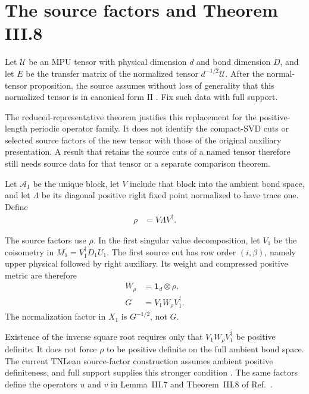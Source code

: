 \documentclass{article}
\begin{document}
\section{The source factors and Theorem III.8}

Let $\mathcal U$ be an MPU tensor with physical dimension $d$ and bond
dimension $D$, and let $E$ be the transfer matrix of the normalized tensor
$d^{-1/2}\mathcal U$. After the normal-tensor proposition, the source assumes
without loss of generality that this normalized tensor is in canonical form II
\cite[discussion following Proposition~III.1]{Cirac2017MPU}. Fix such data with
full support.

The reduced-representative theorem justifies this replacement for the
positive-length periodic operator family. It does not identify the compact-SVD
cuts or selected source factors of the new tensor with those of the original
auxiliary presentation. A result that retains the source cuts of a named tensor
therefore still needs source data for that tensor or a separate comparison
theorem.

Let $\mathcal A_1$ be the unique block, let $V$ include that block into the
ambient bond space, and let $\Lambda$ be its diagonal positive right fixed
point normalized to have trace one. Define
\begin{align}
    \rho & = V\Lambda V^\dagger.
    \label{eq:mpu_canonical_form_full_support_ambient_fixed_point}
\end{align}

The source factors use $\rho$. In the first singular value decomposition, let
$V_1$ be the coisometry in $M_1=V_1^\dagger D_1U_1$. The first source cut has
row order $(i,\beta)$, namely upper physical followed by right auxiliary. Its
weight and compressed positive metric are therefore
\begin{align}
    W_\rho & = \mathbf{1}_d\otimes\rho,
    \label{eq:mpu_canonical_form_full_support_1} \\
    G      & = V_1W_\rho V_1^\dagger.
    \label{eq:mpu_canonical_form_full_support_source_metric_physical_virtual}
\end{align}
The normalization factor in $X_1$ is $G^{-1/2}$, not $G$.

Existence of the inverse square root requires only that
$V_1W_\rho V_1^\dagger$ be positive definite. It does not force $\rho$ to be
positive definite on the full ambient bond space. The current TNLean
source-factor construction assumes ambient positive definiteness, and full
support supplies this stronger condition
\cite[Section~III, source-factor construction]{Cirac2017MPU}. The same factors
define the operators $u$ and $v$ in Lemma~III.7 and Theorem~III.8 of
Ref.~\cite{Cirac2017MPU}.
\end{document}
